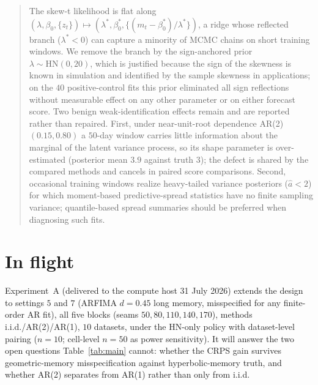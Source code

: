 \documentclass[11pt]{article}
\begin{document}
\begin{quote}\small
The skew-t likelihood is flat along
$(\lambda, \beta_0, \{z_t\}) \mapsto (\lambda^\ast, \beta_0^\ast,
\{(m_t - \beta_0^\ast)/\lambda^\ast\})$, a ridge whose reflected branch
($\lambda^\ast < 0$) can capture a minority of MCMC chains on short
training windows. We remove the branch by the sign-anchored prior
$\lambda \sim \mathrm{HN}(0, 20)$, which is justified because the sign
of the skewness is known in simulation and identified by the sample
skewness in applications; on the $40$ positive-control fits this prior
eliminated all sign reflections without measurable effect on any other
parameter or on either forecast score. Two benign weak-identification
effects remain and are reported rather than repaired. First, under
near-unit-root dependence AR(2)$(0.15, 0.80)$ a $50$-day window carries
little information about the marginal of the latent variance process, so
its shape parameter is over-estimated (posterior mean $3.9$ against
truth $3$); the defect is shared by the compared methods and cancels in
paired score comparisons. Second, occasional training windows realize
heavy-tailed variance posteriors ($\hat a < 2$) for which
moment-based predictive-spread statistics have no finite sampling
variance; quantile-based spread summaries should be preferred when
diagnosing such fits.
\end{quote}

\section{In flight}

Experiment~A (delivered to the compute host 31 July 2026) extends the
design to settings $5$ and $7$ (ARFIMA $d=0.45$ long memory,
misspecified for any finite-order AR fit), all five blocks
(seams $50, 80, 110, 140, 170$), methods i.i.d./AR(2)/AR(1), $10$
datasets, under the HN-only policy with dataset-level pairing
($n = 10$; cell-level $n = 50$ as power sensitivity). It will answer the
two open questions Table~\ref{tab:main} cannot: whether the CRPS gain
survives geometric-memory misspecification against hyperbolic-memory
truth, and whether AR(2) separates from AR(1) rather than only from
i.i.d.
\end{document}

